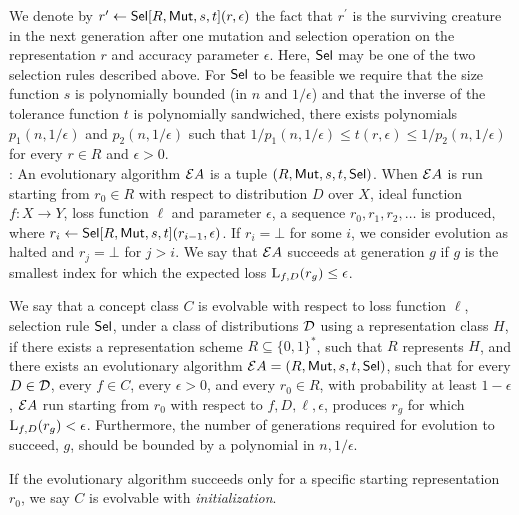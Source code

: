 We denote by $r^\prime \leftarrow \mathsf{Sel}[R, \mathsf{Mut}, s, t](r, \epsilon)$ the fact
that $r^\prime$ is the surviving creature in the next generation after one
mutation and selection operation on the representation $r$ and accuracy
parameter $\epsilon$. Here, $\mathsf{Sel}$ may be one of the two selection rules
described above. For $\mathsf{Sel}$ to be feasible we require that the size function $s$
is polynomially bounded (in $n$ and $1/\epsilon$) and that the inverse of the tolerance
function $t$ is polynomially sandwiched, \ie there exists polynomials $p_1(n,
1/\epsilon)$ and $p_2(n, 1/\epsilon)$ such that $1/p_1(n, 1/\epsilon) \leq t(r,
\epsilon) \leq 1/p_2(n, 1/\epsilon)$ for every $r \in R$ and $\epsilon > 0$.
\medskip \\
%
: An evolutionary algorithm ${\mathcal EA}$ is a
tuple $(R, \mathsf{Mut}, s, t, \mathsf{Sel})$. When ${\mathcal EA}$ is run starting from $r_0 \in R$
with respect to distribution $D$ over $X$, ideal function $f : X \rightarrow Y$,
loss function $\ell$ and parameter $\epsilon$, a sequence $r_0, r_1, r_2,
\ldots$ is produced, where $r_i \leftarrow \mathsf{Sel}[R, \mathsf{Mut}, s, t](r_{i - 1},
\epsilon)$. If $r_i = \bot$ for some $i$, we consider evolution as halted and
$r_j = \bot$ for $j > i$. We say that ${\mathcal EA}$ succeeds at generation $g$ if
$g$ is the smallest index for which the expected loss $\mathrm{L}_{f, D}(r_g) \leq
\epsilon$.

\begin{definition} We say that a
concept class $C$ is evolvable with respect to loss function $\ell$, selection
rule $\mathsf{Sel}$, under a class of distributions ${\mathcal D}$ using a representation
class $H$, if there exists a representation scheme $R \subseteq \{0, 1\}^*$,
such that $R$ represents $H$, and there exists an evolutionary algorithm ${\mathcal EA}
= (R, \mathsf{Mut}, s, t, \mathsf{Sel})$, such that for every $D \in {\mathcal D}$, every $f \in C$,
every $\epsilon > 0$, and every $r_0 \in R$, with probability at least $1 -
\epsilon$, ${\mathcal EA}$ run starting from $r_0$ with respect to $f, D, \ell,
\epsilon$, produces $r_g$ for which $\mathrm{L}_{f, D}(r_g) < \epsilon$.
Furthermore, the number of generations required for evolution to succeed, $g$,
should be bounded by a polynomial in $n, 1/\epsilon$.  \end{definition}

\begin{remark} If the evolutionary algorithm succeeds only for a specific
starting representation $r_0$, we say $C$ is evolvable with
\emph{initialization}. \end{remark}

